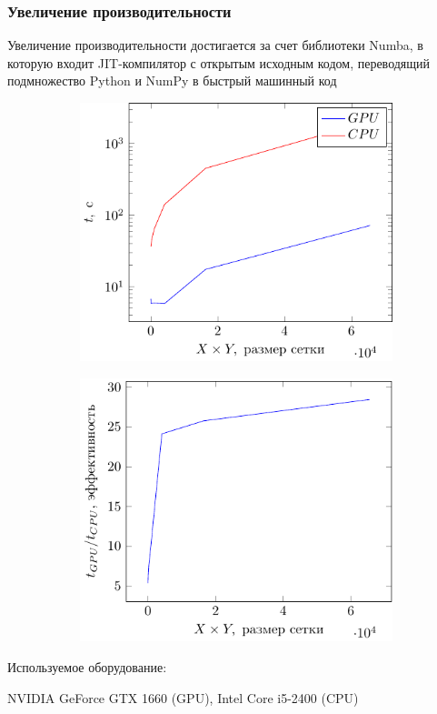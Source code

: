 \documentclass[10pt,pdf,hyperref={unicode}, dvipsnames]{beamer}
\begin{document}
\begin{frame}[t]
	\frametitle{Увеличение производительности}
    Увеличение производительности достигается за счет библиотеки Numba, в
    которую входит JIT-компилятор с открытым исходным кодом,
    переводящий подмножество Python и NumPy в быстрый машинный код
    \begin{figure}[h]
        \begin{subfigure}{0.49\linewidth}
            \centering
            \includegraphics[width=\linewidth]{fig/water/gpucpu.pdf}
        \end{subfigure}
        \begin{subfigure}{0.49\linewidth}
            \centering
            \includegraphics[width=\linewidth]{fig/water/gpucpu1.pdf}
        \end{subfigure}
    \end{figure}
    Используемое оборудование: 

    NVIDIA GeForce GTX 1660 (GPU),
    Intel Core i5-2400 (CPU)
\end{frame}
\end{document}

